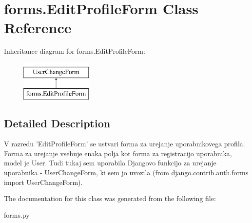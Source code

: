 \section{forms.\+Edit\+Profile\+Form Class Reference}
\label{classforms_1_1_edit_profile_form}
Inheritance diagram for forms.\+Edit\+Profile\+Form\+:\begin{figure}[H]
\begin{center}
\leavevmode
\includegraphics[height=2.000000cm]{classforms_1_1_edit_profile_form}
\end{center}
\end{figure}


\subsection{Detailed Description}
\begin{DoxyVerb}    V razredu 'EditProfileForm' se ustvari forma za urejanje uporabnikovega profila. Forma za urejanje vsebuje enaka polja kot forma za registracijo uporabnika, model je User.
    Tudi tukaj sem uporabila Djangovo funkcijo za urejanje uporabnika - UserChangeForm, ki sem jo uvozila (from django.contrib.auth.forms import UserChangeForm).\end{DoxyVerb}
 

The documentation for this class was generated from the following file\+:\begin{DoxyCompactItemize}
\item 
forms.\+py\end{DoxyCompactItemize}
